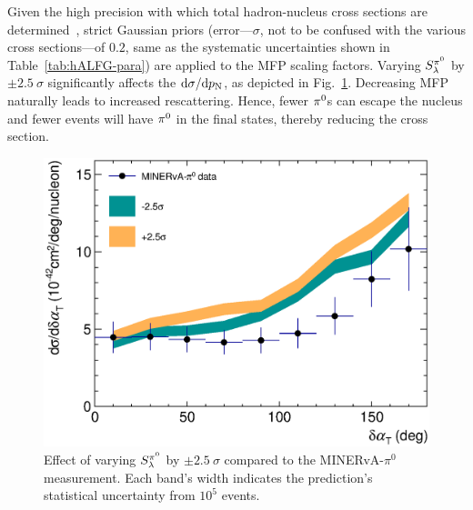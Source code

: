 \begin{enumerate}
    Given the high precision with which total hadron-nucleus cross sections are determined~\cite{LADS:1999dyv,Navon:1983xj,Carroll:1976hj,Clough:1974qt,BAUHOFF1986429}, strict Gaussian priors (error---$\sigma$, not to be confused with the various cross sections---of $0.2$, same as the systematic uncertainties shown in Table~\ref{tab:hALFG-para}) are applied to the MFP scaling factors. 
    Varying $S_\lambda^{\pi^{0}}$ by $\pm2.5~\sigma$ significantly affects the \minpiz $\textrm{d}\sigma/\textrm{d}p_\textrm{N}$, as depicted in Fig.~\ref{fig:minpiz-pn-pi0mfp}. Decreasing MFP naturally leads to increased rescattering. Hence, fewer $\pi^0$s can escape the nucleus and fewer events will have $\pi^0$ in the final states, thereby reducing the cross section. 

    \begin{figure}[!htb]
        \centering
        \includegraphics[width=\sgfigwid\textwidth]{figures/tuning/minerva_pi0_dalphat_FSI_pi0mfp.eps}
        \caption{Effect of varying $S_\lambda^{\pi^{0}}$ by $\pm2.5~\sigma$ compared to the MINERvA-$\pi^0$ measurement. Each band's width indicates the \genie prediction's statistical uncertainty from $10^5$ events.}
        \label{fig:minpiz-pn-pi0mfp}
    \end{figure}


\end{enumerate}
